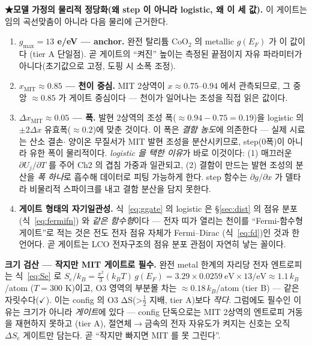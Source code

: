 \documentclass[11pt,a4paper]{article}
\begin{document}
\textbf{★모델 가정의 물리적 정당화(왜 step 이 아니라 logistic, 왜 이 세 값).} 이 게이트는 임의 곡선맞춤이 아니라
다음 물리에 근거한다.
\begin{enumerate}[label=(\roman*),leftmargin=2.2em,itemsep=2pt]
\item \textbf{$g_{\max}=13$ e/eV — anchor.} 완전 탈리튬 $\mathrm{CoO_2}$ 의 metallic $g(E_F)$ 가 이 값이다\cite{motohashi2009}
(tier A 단일점). 곧 게이트의 ``켜진'' 높이는 측정된 끝점이지 자유 파라미터가 아니다(초기값으로 고정, 도핑 시 소폭 조정).
\item \textbf{$x_\mathrm{MIT}\approx0.85$ — 천이 중심.} MIT 2상역이 $x\approx0.75$--$0.94$ 에서 관측되므로\cite{menetrier1999,reimers1992},
그 중앙 $\approx0.85$ 가 게이트 중심이다 — 천이가 일어나는 조성을 직접 읽은 값이다.
\item \textbf{$\Delta x_\mathrm{MIT}\approx0.05$ — 폭.} 발현 2상역의 조성 폭($\approx0.94{-}0.75=0.19$)을 logistic 의
$\pm2\Delta x$ 유효폭($\approx0.2$)에 맞춘 것이다. 이 폭은 \emph{결함 농도}에 의존한다 — 실제 시료는 산소 결손$\cdot$
양이온 무질서가 MIT 발현 조성을 분산시키므로, step(0폭)이 아니라 유한 폭이 물리적이다. \emph{logistic 을 택한 이유}가
바로 이것이다: (1) 매끄러운 $\partial U_j/\partial T$ 를 주어 Ch2 의 겹침 가중과 일관되고, (2) 결함이 만드는 발현 조성의
분산을 \emph{폭 하나}로 흡수해 데이터로 피팅 가능하게 한다. step 함수는 $\partial g/\partial x$ 가 델타라 비물리적
스파이크를 내고 결함 분산을 담지 못한다.
\item \textbf{게이트 형태의 자기일관성.} 식~\eqref{eq:ggate} 의 logistic 은 \S\ref{sec:dist} 의 점유 분포(식~\eqref{eq:fermifn})
와 \emph{같은 함수형}이다 — 전자 띠가 열리는 천이를 ``Fermi-함수형 게이트''로 적는 것은 전도 전자 점유 자체가 Fermi--Dirac
(식~\eqref{eq:fd})인 것과 한 언어다. 곧 게이트는 LCO 전자구조의 점유 분포 관점이 자연히 낳는 꼴이다.
\end{enumerate}

\textbf{크기 검산 — 작지만 MIT 게이트로 필수.} 완전 metal 한계의 자리당 전자 엔트로피는 식~\eqref{eq:Se} 로
$S_e/k_B=\tfrac{\pi^2}{3}(k_BT)\,g(E_F)=3.29\times0.0259\ \mathrm{eV}\times13/\mathrm{eV}\approx1.1\,k_B$/atom
($T{=}300$ K)이고, O3 영역의 부분몰 차는 $\approx0.18\,k_B$/atom\cite{reynier2004} (tier B) — 같은 자릿수다($\checkmark$). 이는
config 의 O3 ΔS(>$\tfrac12$ 지배\cite{reynier2004}, tier A)보다 \emph{작다}. 그럼에도 필수인 이유는 크기가 아니라 \emph{게이트}에 있다 —
config 단독으로는 MIT 2상역의 엔트로피 거동을 재현하지 못하고\cite{ml2024} (tier A), 절연체$\to$금속의 전자 자유도가 켜지는
신호는 오직 $\Delta S_e$ 게이트만 담는다. 곧 ``작지만 빠지면 MIT 를 못 그린다''.
\end{document}
